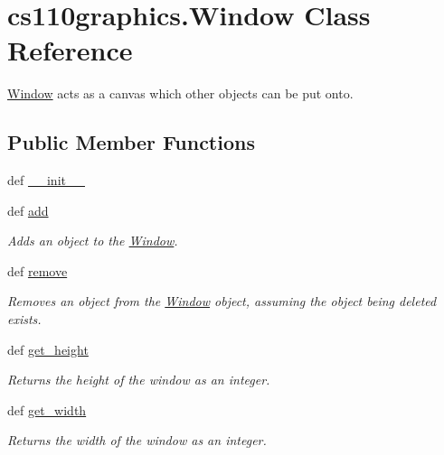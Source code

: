 \hypertarget{classcs110graphics_1_1Window}{
\section{cs110graphics.Window Class Reference}
\label{classcs110graphics_1_1Window}
}


\hyperlink{classcs110graphics_1_1Window}{Window} acts as a canvas which other objects can be put onto.  
\subsection*{Public Member Functions}
\begin{DoxyCompactItemize}
\item 
def \hyperlink{classcs110graphics_1_1Window_af926549e3d731847886302fa390f2863}{\_\-\_\-init\_\-\_\-}
\item 
def \hyperlink{classcs110graphics_1_1Window_a34064de02d5149841a23764e78085d18}{add}
\begin{DoxyCompactList}\small\item\em Adds an object to the \hyperlink{classcs110graphics_1_1Window}{Window}. \item\end{DoxyCompactList}\item 
def \hyperlink{classcs110graphics_1_1Window_a14aba875d32f8a70a0c5a80ac3f18a92}{remove}
\begin{DoxyCompactList}\small\item\em Removes an object from the \hyperlink{classcs110graphics_1_1Window}{Window} object, assuming the object being deleted exists. \item\end{DoxyCompactList}\item 
def \hyperlink{classcs110graphics_1_1Window_a2ab7070110bd58c95e8f29c10d71c7cc}{get\_\-height}
\begin{DoxyCompactList}\small\item\em Returns the height of the window as an integer. \item\end{DoxyCompactList}\item 
def \hyperlink{classcs110graphics_1_1Window_a41d27bb09f5033f0596af9f1a3a9b519}{get\_\-width}
\begin{DoxyCompactList}\small\item\em Returns the width of the window as an integer. \item\end{DoxyCompactList}\item 

\end{DoxyCompactItemize}
